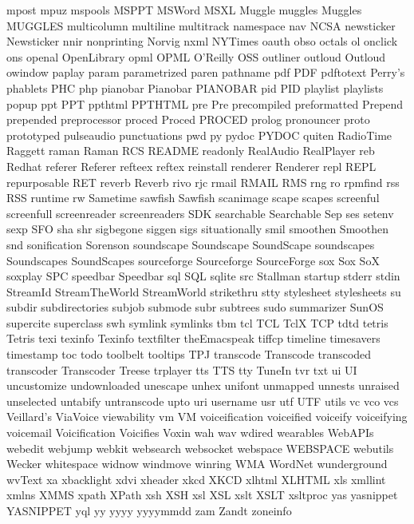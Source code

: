 mpost
mpuz
mspools
MSPPT
MSWord
MSXL
Muggle
muggles
Muggles
MUGGLES
multicolumn
multiline
multitrack
namespace
nav
NCSA
newsticker
Newsticker
nnir
nonprinting
Norvig
nxml
NYTimes
oauth
obso
octals
ol
onclick
ons
openal
OpenLibrary
opml
OPML
O'Reilly
OSS
outliner
outloud
Outloud
owindow
paplay
param
parametrized
paren
pathname
pdf
PDF
pdftotext
Perry's
phablets
PHC
php
pianobar
Pianobar
PIANOBAR
pid
PID
playlist
playlists
popup
ppt
PPT
ppthtml
PPTHTML
pre
Pre
precompiled
preformatted
Prepend
prepended
preprocessor
proced
Proced
PROCED
prolog
pronouncer
proto
prototyped
pulseaudio
punctuations
pwd
py
pydoc
PYDOC
quiten
RadioTime
Raggett
raman
Raman
RCS
README
readonly
RealAudio
RealPlayer
reb
Redhat
referer
Referer
refteex
reftex
reinstall
renderer
Renderer
repl
REPL
repurposable
RET
reverb
Reverb
rivo
rjc
rmail
RMAIL
RMS
rng
ro
rpmfind
rss
RSS
runtime
rw
Sametime
sawfish
Sawfish
scanimage
scape
scapes
screenful
screenfull
screenreader
screenreaders
SDK
searchable
Searchable
Sep
ses
setenv
sexp
SFO
sha
shr
sigbegone
siggen
sigs
situationally
smil
smoothen
Smoothen
snd
sonification
Sorenson
soundscape
Soundscape
SoundScape
soundscapes
Soundscapes
SoundScapes
sourceforge
Sourceforge
SourceForge
sox
Sox
SoX
soxplay
SPC
speedbar
Speedbar
sql
SQL
sqlite
src
Stallman
startup
stderr
stdin
StreamId
StreamTheWorld
StreamWorld
strikethru
stty
stylesheet
stylesheets
su
subdir
subdirectories
subjob
submode
subr
subtrees
sudo
summarizer
SunOS
supercite
superclass
swh
symlink
symlinks
tbm
tcl
TCL
TclX
TCP
tdtd
tetris
Tetris
texi
texinfo
Texinfo
textfilter
theEmacspeak
tiffcp
timeline
timesavers
timestamp
toc
todo
toolbelt
tooltips
TPJ
transcode
Transcode
transcoded
transcoder
Transcoder
Treese
trplayer
tts
TTS
tty
TuneIn
tvr
txt
ui
UI
uncustomize
undownloaded
unescape
unhex
unifont
unmapped
unnests
unraised
unselected
untabify
untranscode
upto
uri
username
usr
utf
UTF
utils
vc
vco
vcs
Veillard's
ViaVoice
viewability
vm
VM
voiceification
voiceified
voiceify
voiceifying
voicemail
Voicification
Voicifies
Voxin
wah
wav
wdired
wearables
WebAPIs
webedit
webjump
webkit
websearch
websocket
webspace
WEBSPACE
webutils
Wecker
whitespace
widnow
windmove
winring
WMA
WordNet
wunderground
wvText
xa
xbacklight
xdvi
xheader
xkcd
XKCD
xlhtml
XLHTML
xls
xmllint
xmlns
XMMS
xpath
XPath
xsh
XSH
xsl
XSL
xslt
XSLT
xsltproc
yas
yasnippet
YASNIPPET
yql
yy
yyyy
yyyymmdd
zam
Zandt
zoneinfo
